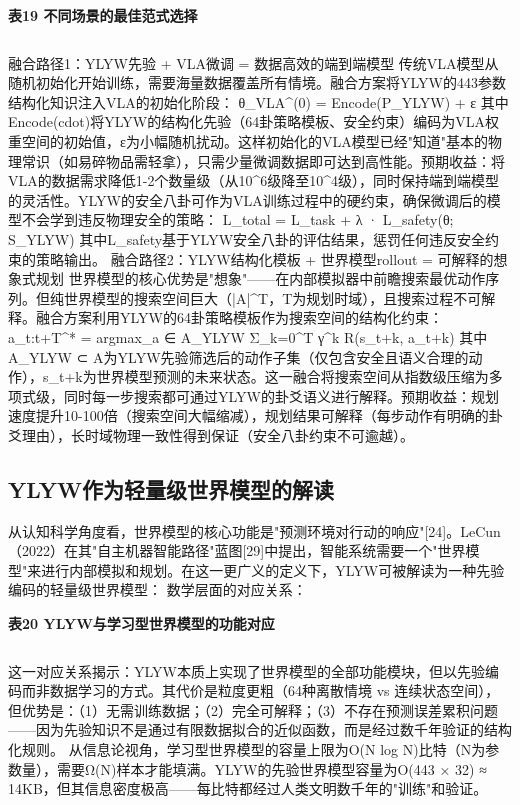 \documentclass[12pt,a4paper]{article}
\begin{document}
\begin{center}
\textbf{表19  不同场景的最佳范式选择}
\begin{tabular}{lcccc}
\hline
\end{tabular}
\end{center}
融合路径1：YLYW先验 + VLA微调 = 数据高效的端到端模型
传统VLA模型从随机初始化开始训练，需要海量数据覆盖所有情境。融合方案将YLYW的443参数结构化知识注入VLA的初始化阶段：
θ\_VLA^(0) = Encode(P\_YLYW) + ε
其中Encode(cdot)将YLYW的结构化先验（64卦策略模板、安全约束）编码为VLA权重空间的初始值，ε为小幅随机扰动。这样初始化的VLA模型已经"知道"基本的物理常识（如易碎物品需轻拿），只需少量微调数据即可达到高性能。预期收益：将VLA的数据需求降低1-2个数量级（从10^6级降至10^4级），同时保持端到端模型的灵活性。YLYW的安全八卦可作为VLA训练过程中的硬约束，确保微调后的模型不会学到违反物理安全的策略：
L\_total = L\_task + λ · L\_safety(θ; S\_YLYW)
其中L\_{safety}基于YLYW安全八卦的评估结果，惩罚任何违反安全约束的策略输出。
融合路径2：YLYW结构化模板 + 世界模型rollout = 可解释的想象式规划
世界模型的核心优势是"想象"——在内部模拟器中前瞻搜索最优动作序列。但纯世界模型的搜索空间巨大（|A|^T，T为规划时域），且搜索过程不可解释。融合方案利用YLYW的64卦策略模板作为搜索空间的结构化约束：
a\_t:t+T^* = argmax\_a ∈ A\_YLYW Σ\_k=0^T γ^k R(s\_t+k, a\_t+k)
其中A\_{YLYW} ⊂ A为YLYW先验筛选后的动作子集（仅包含安全且语义合理的动作），s\_{t+k}为世界模型预测的未来状态。这一融合将搜索空间从指数级压缩为多项式级，同时每一步搜索都可通过YLYW的卦爻语义进行解释。预期收益：规划速度提升10-100倍（搜索空间大幅缩减），规划结果可解释（每步动作有明确的卦爻理由），长时域物理一致性得到保证（安全八卦约束不可逾越）。

\subsection{YLYW作为轻量级世界模型的解读}
从认知科学角度看，世界模型的核心功能是"预测环境对行动的响应"[24]。LeCun（2022）在其"自主机器智能路径"蓝图[29]中提出，智能系统需要一个"世界模型"来进行内部模拟和规划。在这一更广义的定义下，YLYW可被解读为一种先验编码的轻量级世界模型：
数学层面的对应关系：

\begin{center}
\textbf{表20  YLYW与学习型世界模型的功能对应}
\begin{tabular}{lcccc}
\hline
\end{tabular}
\end{center}
这一对应关系揭示：YLYW本质上实现了世界模型的全部功能模块，但以先验编码而非数据学习的方式。其代价是粒度更粗（64种离散情境 vs 连续状态空间），但优势是：（1）无需训练数据；（2）完全可解释；（3）不存在预测误差累积问题——因为先验知识不是通过有限数据拟合的近似函数，而是经过数千年验证的结构化规则。
从信息论视角，学习型世界模型的容量上限为O(N log N)比特（N为参数量），需要Ω(N)样本才能填满。YLYW的先验世界模型容量为O(443 × 32) ≈ 14KB，但其信息密度极高——每比特都经过人类文明数千年的"训练"和验证。
\end{document}
